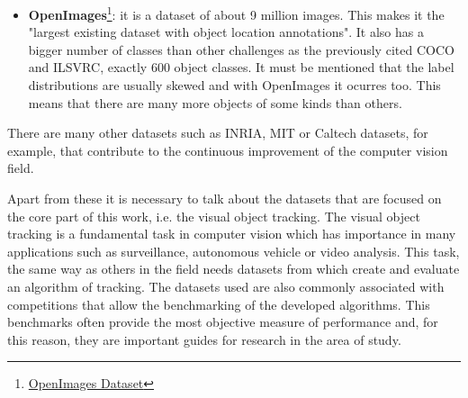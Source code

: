 \documentclass{bmvc2k}
\begin{document}
\begin{itemize}
\item \textbf{OpenImages}\footnote {\href{https://storage.googleapis.com/openimages/web/index.html}{OpenImages Dataset}}: it is a dataset of about 9 million images. This makes it the "largest existing dataset with object location annotations". It also has a bigger number of classes than other challenges as the previously cited COCO and ILSVRC, exactly 600 object classes. It must be mentioned that the label distributions are usually skewed and with OpenImages it ocurres too. This means that there are many more objects of some kinds than others.
\end{itemize}
There are many other datasets such as INRIA, MIT or Caltech datasets, for example, that contribute to the continuous improvement of the computer vision field.

Apart from these it is necessary to talk about the datasets that are focused on the core part of this work, i.e. the visual object tracking. The visual object tracking is a fundamental task in computer vision which has importance in many applications such as surveillance, autonomous vehicle or video analysis. This task, the same way as others in the field needs datasets from which create and evaluate an algorithm of tracking. The datasets used are also commonly associated with competitions that allow the benchmarking of the developed algorithms. This benchmarks often provide the most objective measure of performance and, for this reason, they are important guides for research in the area of study.
\end{document}
